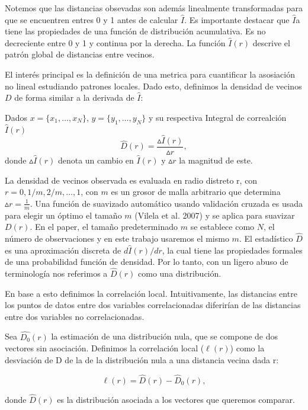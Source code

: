 	Notemos que las distancias obsevadas son adem\'as linealmente transformadas para que se encuentren entres 0 y 1 antes de calcular $\hat{I}$. Es importante destacar que $\hat{I}$a tiene las propiedades de una funci\'on de distribuci\'on acumulativa. Es no decreciente entre 0 y 1 y continua por la derecha. La funci\'on $\hat{I}(r)$ descrive el patr\'on global de distancias entre vecinos. 

	El inter\'es principal es la definici\'on de una metrica para cuantificar la asosiaci\'on no lineal estudiando patrones locales. Dado esto, definimos la densidad de vecinos $D$ de forma similar a la derivada de $\hat{I}$: 
	\begin{defn} 
		Dados $x= \{x_1,\dots,x_N\} $, $y=\{y_1,\dots,y_N\}$ y su respectiva Integral de correalci\'on $\hat{I}(r)$
		$$
		\hat{D}(r)= \frac{\vartriangle\hat{I}(r)}{\vartriangle r},
		$$
		donde $\vartriangle\hat{I}(r)$ denota un cambio en $\hat{I}(r)$ y $\vartriangle r$ la magnitud de este.
	\end{defn}
	
	La densidad de vecinos observada es evaluada en radio distreto r, con $r=0,1/m, 2/m, \dots, 1$, con $m$ es un grosor de malla arbitrario que determina $\vartriangle r = \frac{1}{m}$. Una funci\'on de suavizado autom\'atico usando validaci\'on cruzada es usada para elegir un \'optimo el tama\~no $m$ (Vilela et al. 2007) y se aplica para suavizar $D(r)$. En el paper, el tama\~no predeterminado $m$ se establece como $N$, el n\'umero de observaciones y en este trabajo usaremos el mismo $m$. El estad\'istico $\hat{D}$ es una aproximaci\'on discreta de $d\hat{I}(r)/d r$, la cual tiene las propiedades formales de una probabilidad funci\'on de densidad. Por lo tanto, con un ligero abuso de terminolog\'ia nos referimos a $\widehat{D}(r)$ como una distribuci\'on.

	En base a esto definimos la correlaci\'on local. Intuitivamente, las distancias entre los puntos de datos entre dos variables correlacionadas diferir\'ian de las distancias entre dos variables no correlacionadas. 
	
	\begin{defn}
	
		Sea $\widehat{D_0}(r)$ la estimaci\'on de una distribuci\'on nula, que se compone de dos vectores sin asociaci\'on. Definimos la correlaci\'on local ($\ell(r)$) como la desviaci\'on de D de la de la distribuci\'on nula a una distancia vecina dada r:

		$$
			\ell(r)=\widehat{D}(r)-\widehat{D}_{0}(r),
		$$	

		donde $\widehat{D}(r)$ es la distribuci\'on asociada a los vectores que queremos comparar.

	\end{defn}

